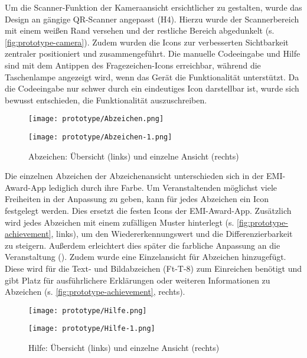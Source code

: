 Um die Scanner-Funktion der Kameraansicht ersichtlicher zu gestalten, wurde das
Design an gängige QR-Scanner angepasst (H4). Hierzu wurde der Scannerbereich mit
einem weißen Rand versehen und der restliche Bereich abgedunkelt (s.
\autoref{fig:prototype-camera}). Zudem wurden die Icons zur verbesserten
Sichtbarkeit zentraler positioniert und zusammengeführt. Die manuelle
Codeeingabe und Hilfe sind mit dem Antippen des Fragezeichen-Icons erreichbar,
während die Taschenlampe angezeigt wird, wenn das Gerät die Funktionalität
unterstützt. Da die Codeeingabe nur schwer durch ein eindeutiges Icon
darstellbar ist, wurde sich bewusst entschieden, die Funktionalität auszuschreiben.

\begin{figure}[htpb]
    \begin{minipage}{.5\textwidth}
        \centering
        \texttt{[image: prototype/Abzeichen.png]}
    \end{minipage}%
    \begin{minipage}{.5\textwidth}
        \centering
        \texttt{[image: prototype/Abzeichen-1.png]}
    \end{minipage}
    \caption{Abzeichen: Übersicht (links) und einzelne Ansicht (rechts)}
    \label{fig:prototype-achievement}
\end{figure}

Die einzelnen Abzeichen der Abzeichenansicht unterschieden sich in der
EMI-Award-App lediglich durch ihre Farbe. Um Veranstaltenden möglichst viele
Freiheiten in der Anpassung zu geben, kann für jedes Abzeichen ein Icon
festgelegt werden. Dies ersetzt die festen Icons der EMI-Award-App. Zusätzlich
wird jedes Abzeichen mit einem zufälligen Muster hinterlegt (s.
\autoref{fig:prototype-achievement}, links), um den Wiedererkennungswert und die
Differenzierbarkeit zu steigern. Außerdem erleichtert dies später die farbliche
Anpassung an die Veranstaltung (). Zudem wurde eine Einzelansicht
für Abzeichen hinzugefügt. Diese wird für die Text- und Bildabzeichen (Ft-T-8)
zum Einreichen benötigt und gibt Platz für ausführlichere Erklärungen oder
weiteren Informationen zu Abzeichen (s. \autoref{fig:prototype-achievement},
rechts).

\begin{figure}[htpb]
    \begin{minipage}{.5\textwidth}
        \centering
        \texttt{[image: prototype/Hilfe.png]}
    \end{minipage}%
    \begin{minipage}{.5\textwidth}
        \centering
        \texttt{[image: prototype/Hilfe-1.png]}
    \end{minipage}
    \caption{Hilfe: Übersicht (links) und einzelne Ansicht (rechts)}
    \label{fig:prototype-help}
\end{figure}

